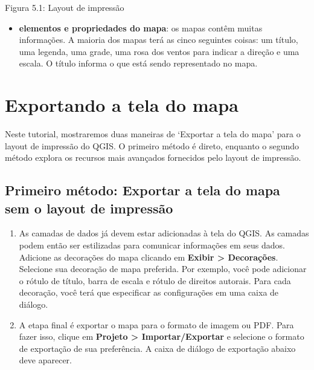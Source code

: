 \documentclass[
]{krantz}
\providecommand{\tightlist}{%
  \setlength{\itemsep}{0pt}\setlength{\parskip}{0pt}}
\begin{document}
Figura 5.1: Layout de impressão

\begin{itemize}
\tightlist
\item
  \textbf{elementos e propriedades do mapa}: os mapas contêm muitas informações. A maioria dos mapas terá as cinco seguintes coisas: um título, uma legenda, uma grade, uma rosa dos ventos para indicar a direção e uma escala. O título informa o que está sendo representado no mapa.
\end{itemize}

\hypertarget{exportando-a-tela-do-mapa}{%
\section{Exportando a tela do mapa}\label{exportando-a-tela-do-mapa}}

Neste tutorial, mostraremos duas maneiras de `Exportar a tela do mapa' para o layout de impressão do QGIS. O primeiro método é direto, enquanto o segundo método explora os recursos mais avançados fornecidos pelo layout de impressão.

\hypertarget{primeiro-muxe9todo-exportar-a-tela-do-mapa-sem-o-layout-de-impressuxe3o}{%
\subsection{Primeiro método: Exportar a tela do mapa sem o layout de impressão}\label{primeiro-muxe9todo-exportar-a-tela-do-mapa-sem-o-layout-de-impressuxe3o}}

\begin{enumerate}
\def\labelenumi{\arabic{enumi}.}
\tightlist
\item
  As camadas de dados já devem estar adicionadas à tela do QGIS. As camadas podem então ser estilizadas para comunicar informações em seus dados. Adicione as decorações do mapa clicando em \textbf{Exibir \textgreater{} Decorações}. Selecione sua decoração de mapa preferida. Por exemplo, você pode adicionar o rótulo de título, barra de escala e rótulo de direitos autorais. Para cada decoração, você terá que especificar as configurações em uma caixa de diálogo.
\item
  A etapa final é exportar o mapa para o formato de imagem ou PDF. Para fazer isso, clique em \textbf{Projeto \textgreater{} Importar/Exportar} e selecione o formato de exportação de sua preferência. A caixa de diálogo de exportação abaixo deve aparecer.
\end{enumerate}
\end{document}
